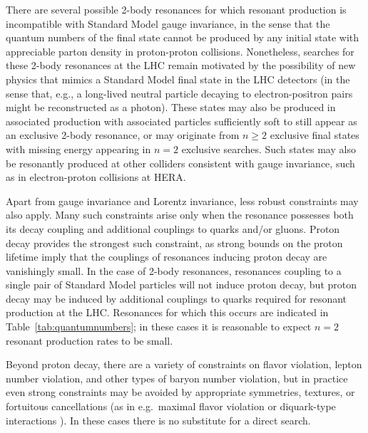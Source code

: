 There are several possible 2-body resonances for which resonant production is incompatible with Standard Model gauge invariance, in the sense that the quantum numbers of the final state cannot be produced by any initial state with appreciable parton density in proton-proton collisions. Nonetheless, searches for these 2-body resonances at the LHC remain motivated by the possibility of new physics that mimics a Standard Model final state in the LHC detectors (in the sense that, e.g., a long-lived neutral particle decaying to electron-positron pairs might be reconstructed as a photon). These states may also be produced in associated production with associated particles sufficiently soft to still appear as an exclusive 2-body resonance, or may originate from $n \geq 2$ exclusive final states with missing energy appearing in $n=2$ exclusive searches. Such states may also be resonantly produced at other colliders consistent with gauge invariance, such as in electron-proton collisions at HERA.

Apart from gauge invariance and Lorentz invariance, less robust constraints may also apply. Many such constraints arise only when the resonance possesses both its decay coupling and additional couplings to quarks and/or gluons. Proton decay provides the strongest such constraint, as strong bounds on the proton lifetime imply that the couplings of resonances inducing proton decay are vanishingly small. In the case of 2-body resonances, resonances coupling to a single pair of Standard Model particles will not induce proton decay, but proton decay may be induced by additional couplings to quarks required for resonant production at the LHC. Resonances for which this occurs are indicated in Table~\ref{tab:quantumnumbers}; in these cases it is reasonable to expect $n=2$ resonant production rates to be small.

Beyond proton decay, there are a variety of constraints on flavor violation, lepton number violation, and other types of baryon number violation, but in practice even strong constraints may be avoided by appropriate symmetries, textures, or fortuitous cancellations (as in e.g.~maximal flavor violation \cite{BarShalom:2007pw} or diquark-type interactions \cite{Giudice:2011ak}). In these cases there is no substitute for a direct search. 


